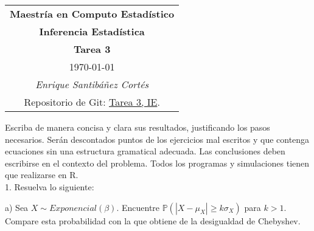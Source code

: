 \documentclass[11pt,letterpaper]{article}
\newcommand{\mP}{\mathbb{P}}
\begin{document}
\begin{table}[ht]
\centering
\begin{tabular}{c}
\textbf{Maestría en Computo Estadístico}\\
\textbf{Inferencia Estadística} \\
\textbf{Tarea 3}\\
\today \\
\emph{Enrique Santibáñez Cortés}\\
Repositorio de Git: \href{https://github.com/Enriquesec/Inferencia_Estad-stica/tree/master/Tareas/Tarea_3}{Tarea 3, IE}.
\end{tabular}
\end{table}
Escriba de manera concisa y clara sus resultados, justificando los pasos necesarios. Serán descontados puntos de los ejercicios mal escritos y que contenga ecuaciones sin una estructura gramatical adecuada. Las conclusiones deben escribirse en el contexto del problema. Todos los programas y
simulaciones tienen que realizarse en R.\\

1. Resuelva lo siguiente:

a) Sea $X\sim Exponencial(\beta)$. Encuentre $\mP(|X-\mu_X |\geq k\sigma_X)$ para $k>1$. Compare esta probabilidad con la que obtiene de la desigualdad de Chebyshev. 
\end{document}
